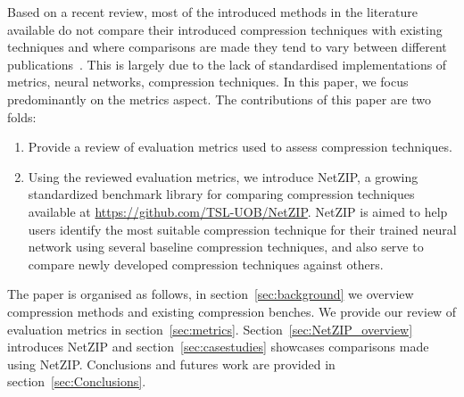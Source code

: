   




Based on a recent review, most of the introduced methods in the literature available do not compare their introduced compression techniques with existing techniques and where comparisons are made they tend to vary between different publications~\cite{Blalock2020}.
%
This is largely due to the lack of standardised implementations of metrics, neural networks, compression techniques. 
%
In this paper, we focus predominantly on the metrics aspect.
%
The contributions of this paper are two folds: 
\begin{enumerate}
    \item Provide a review of evaluation metrics used to assess compression techniques. 
    \item Using the reviewed evaluation metrics, we introduce NetZIP, a growing standardized benchmark library for comparing compression techniques available at \url{https://github.com/TSL-UOB/NetZIP}. NetZIP is aimed to help users identify the most suitable compression technique for their trained neural network using several baseline compression techniques, and also serve to compare newly developed compression techniques against others.%
\end{enumerate}
%

The paper is organised as follows, in section~\ref{sec:background} we overview compression methods and existing compression benches. We provide our review of evaluation metrics in section~\ref{sec:metrics}. Section~\ref{sec:NetZIP_overview} introduces NetZIP and section~\ref{sec:casestudies} showcases comparisons made using NetZIP. Conclusions and futures work are provided in section~\ref{sec:Conclusions}.


